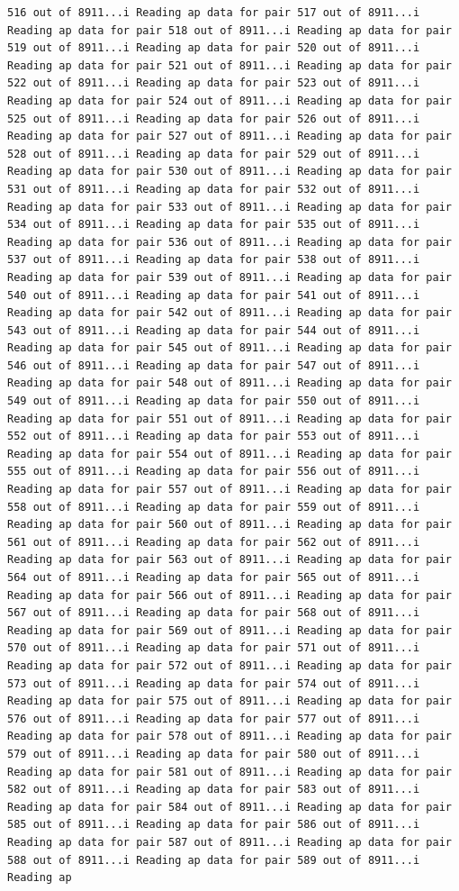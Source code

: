 \documentclass[
]{article}
\begin{document}
\begin{verbatim}
516 out of 8911...i Reading ap data for pair 517 out of 8911...i Reading ap data for pair 518 out of 8911...i Reading ap data for pair 519 out of 8911...i Reading ap data for pair 520 out of 8911...i Reading ap data for pair 521 out of 8911...i Reading ap data for pair 522 out of 8911...i Reading ap data for pair 523 out of 8911...i Reading ap data for pair 524 out of 8911...i Reading ap data for pair 525 out of 8911...i Reading ap data for pair 526 out of 8911...i Reading ap data for pair 527 out of 8911...i Reading ap data for pair 528 out of 8911...i Reading ap data for pair 529 out of 8911...i Reading ap data for pair 530 out of 8911...i Reading ap data for pair 531 out of 8911...i Reading ap data for pair 532 out of 8911...i Reading ap data for pair 533 out of 8911...i Reading ap data for pair 534 out of 8911...i Reading ap data for pair 535 out of 8911...i Reading ap data for pair 536 out of 8911...i Reading ap data for pair 537 out of 8911...i Reading ap data for pair 538 out of 8911...i Reading ap data for pair 539 out of 8911...i Reading ap data for pair 540 out of 8911...i Reading ap data for pair 541 out of 8911...i Reading ap data for pair 542 out of 8911...i Reading ap data for pair 543 out of 8911...i Reading ap data for pair 544 out of 8911...i Reading ap data for pair 545 out of 8911...i Reading ap data for pair 546 out of 8911...i Reading ap data for pair 547 out of 8911...i Reading ap data for pair 548 out of 8911...i Reading ap data for pair 549 out of 8911...i Reading ap data for pair 550 out of 8911...i Reading ap data for pair 551 out of 8911...i Reading ap data for pair 552 out of 8911...i Reading ap data for pair 553 out of 8911...i Reading ap data for pair 554 out of 8911...i Reading ap data for pair 555 out of 8911...i Reading ap data for pair 556 out of 8911...i Reading ap data for pair 557 out of 8911...i Reading ap data for pair 558 out of 8911...i Reading ap data for pair 559 out of 8911...i Reading ap data for pair 560 out of 8911...i Reading ap data for pair 561 out of 8911...i Reading ap data for pair 562 out of 8911...i Reading ap data for pair 563 out of 8911...i Reading ap data for pair 564 out of 8911...i Reading ap data for pair 565 out of 8911...i Reading ap data for pair 566 out of 8911...i Reading ap data for pair 567 out of 8911...i Reading ap data for pair 568 out of 8911...i Reading ap data for pair 569 out of 8911...i Reading ap data for pair 570 out of 8911...i Reading ap data for pair 571 out of 8911...i Reading ap data for pair 572 out of 8911...i Reading ap data for pair 573 out of 8911...i Reading ap data for pair 574 out of 8911...i Reading ap data for pair 575 out of 8911...i Reading ap data for pair 576 out of 8911...i Reading ap data for pair 577 out of 8911...i Reading ap data for pair 578 out of 8911...i Reading ap data for pair 579 out of 8911...i Reading ap data for pair 580 out of 8911...i Reading ap data for pair 581 out of 8911...i Reading ap data for pair 582 out of 8911...i Reading ap data for pair 583 out of 8911...i Reading ap data for pair 584 out of 8911...i Reading ap data for pair 585 out of 8911...i Reading ap data for pair 586 out of 8911...i Reading ap data for pair 587 out of 8911...i Reading ap data for pair 588 out of 8911...i Reading ap data for pair 589 out of 8911...i Reading ap 
\end{verbatim}
\end{document}
